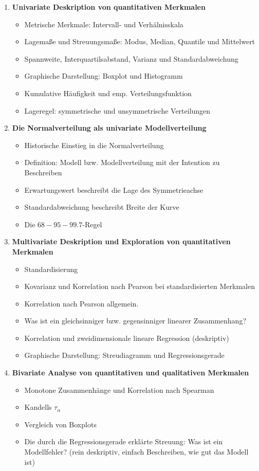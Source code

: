 \documentclass[a4paper,fontsize=12pt]{scrartcl}
\begin{document}
\begin{enumerate}
{  }
  
    \item{\textbf{Univariate Deskription  von  quantitativen Merkmalen}
    \begin{itemize}
    \item{Metrische Merkmale: Intervall- und Verhälnisskala}
     \item{Lagemaße und Streuungsmaße: Modus, Median, Quantile und Mittelwert} %
        \item{Spannweite, Interquartilsabstand, Varianz und Standardabweichung}
        \item{Graphische Darstellung: Boxplot und Histogramm}
        \item{Kumulative Häufigkeit und emp. Verteilungsfunktion}
        \item{Lageregel: symmetrische und unsymmetrische Verteilungen}
  \end{itemize}
  }
  \item{ \textbf{Die Normalverteilung als univariate Modellverteilung}
       \begin{itemize}
       \item{Historische Einstieg in die Normalverteilung}
            \item{Definition: Modell bzw. Modellverteilung mit der Intention zu Beschreiben}
	    \item{Erwartungswert beschreibt die Lage des Symmetrieachse}
	    \item{Standardabweichung beschreibt Breite der Kurve}
	    \item{Die $68-95-99.7$-Regel}
	    \end{itemize}
        }
     \item{\textbf{Multivariate Deskription und Exploration von  quantitativen Merkmalen}
    \begin{itemize}
          \item{Standardisierung}
          \item{Kovarianz und Korrelation nach Pearson bei standardisierten Merkmalen}
          \item{Korrelation nach Pearson allgemein.}
          \item{Was ist ein gleichsinniger bzw. gegensinniger linearer Zusammenhang?}
         \item{Korrelation und zweidimensionale lineare Regression (deskriptiv)} %
         \item{Graphische Darstellung: Streudiagramm und Regressionsgerade}
    \end{itemize}
  }
  \item{\textbf{Bivariate Analyse von quantitativen und qualitativen Merkmalen}
    \begin{itemize}
      \item{Monotone Zusammenhänge und Korrelation nach Spearman}
      \item{Kandells $\tau_{\alpha}$}
      \item{Vergleich von Boxplots}
      \item{Die durch die Regressionsgerade erklärte Streuung: Was ist ein Modellfehler?
      (rein deskriptiv, einfach Beschreiben, wie gut das Modell ist)}
    \end{itemize}
  }
  

\end{enumerate}
\end{document}
